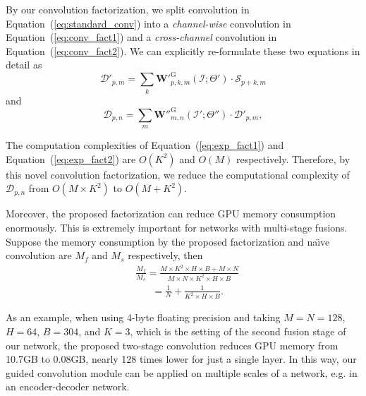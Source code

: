 \documentclass[journal]{IEEEtran}
\begin{document}
By our convolution factorization,
we split convolution in Equation~(\ref{eq:standard_conv}) into a \emph{channel-wise} convolution in Equation~(\ref{eq:conv_fact1})
and a \emph{cross-channel} convolution in Equation~(\ref{eq:conv_fact2}).
We can explicitly re-formulate these two equations in detail as
\begin{equation} \label{eq:exp_fact1} 
    \mathcal{D}'_{p,m} = \sum_{k}{\mathbf{W'}}_{p,k,m}^{\mathrm{G}}(\mathcal{I};\Theta') \cdot \mathcal{S}_{p+k,m} 
\end{equation}
 and
 \begin{equation} \label{eq:exp_fact2} 
    \mathcal{D}_{p,n} = \sum_{m}\mathbf{W''}_{m,n}^{\mathrm{G}}(\mathcal{I'};\Theta'') \cdot \mathcal{D'}_{p,m}, 
 \end{equation} 

The computation complexities of Equation~(\ref{eq:exp_fact1}) and Equation~(\ref{eq:exp_fact2}) are $O(K^2)$ and $O(M)$ respectively.
Therefore,
by this novel convolution factorization,
we reduce the computational complexity of $\mathcal{D}_{p,n}$ from $O(M \times K^2)$ to $O(M + K^2)$. 

Moreover, the proposed factorization can reduce GPU memory consumption enormously.
This is extremely important for networks with multi-stage fusions.
Suppose the memory consumption by the proposed factorization and na\"{\i}ve convolution are $M_f$ and $M_s$ respectively, then
\begin{equation}
\label{eq:memory_compare}
   \begin{split}
   & \frac{M_f}{M_s} = \frac{ M\times K^{2}\times H \times B + M \times N}{ M \times N\times K^{2}\times H \times B } \\
   & \quad \ \ \ =\frac{1}{N} + \frac{1}{K^{2}\times H \times B }.
   \end{split}
\end{equation}

As an example, when using 4-byte floating precision and taking $M = N = 128$, $H = 64$, $B=304$, and $K=3$,
which is the setting of the second fusion stage of our network, the proposed two-stage convolution reduces GPU memory from 10.7GB to 0.08GB, nearly 128 times lower for just a single layer.
In this way, our guided convolution module can be applied on multiple scales of a network, e.g. in an encoder-decoder network.
\end{document}
